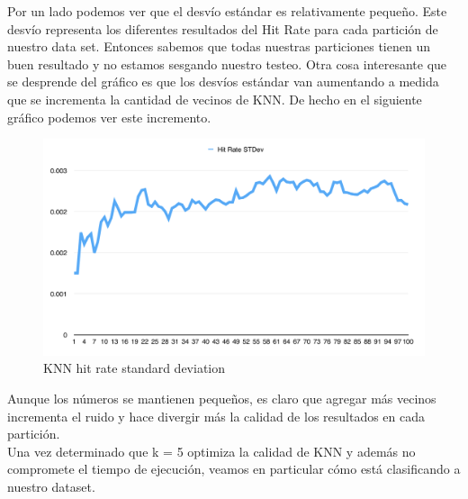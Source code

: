 Por un lado podemos ver que el desvío estándar es relativamente pequeño. Este desvío representa los diferentes resultados del Hit Rate para cada partición de nuestro data set. Entonces sabemos que todas nuestras particiones tienen un buen resultado y no estamos sesgando nuestro testeo.
Otra cosa interesante que se desprende del gráfico es que los desvíos estándar van aumentando a medida que se incrementa la cantidad de vecinos de KNN. De hecho en el siguiente gráfico podemos ver este incremento.

\begin{figure}[h!]
  \begin{center}
	\includegraphics[scale=0.5]{exp1/KNN-5p-Hit-Rate-stdev.png}
	\caption{KNN hit rate standard deviation}
  \end{center}
\end{figure}

Aunque los números se mantienen pequeños, es claro que agregar más vecinos incrementa el ruido y hace divergir más la calidad de los resultados en cada partición.\\

Una vez determinado que k = 5 optimiza la calidad de KNN y además no compromete el tiempo de ejecución, veamos en particular cómo está clasificando a nuestro dataset.


